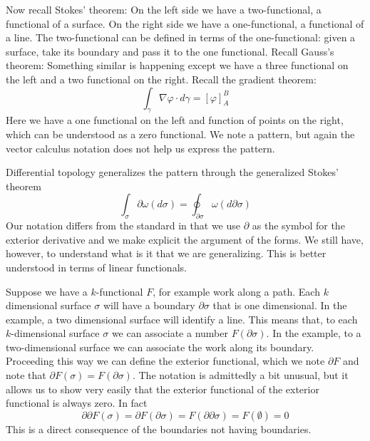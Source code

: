 \documentclass[fleqn,10pt]{wlscirep}
\begin{document}

Now recall Stokes' theorem:
On the left side we have a two-functional, a functional of a surface. On the right side we have a one-functional, a functional of a line. The two-functional can be defined in terms of the one-functional: given a surface, take its boundary and pass it to the one functional. Recall Gauss's theorem:
Something similar is happening except we have a three functional on the left and a two functional on the right. Recall the gradient theorem:
\begin{equation*}
	\int_\gamma \nabla \varphi \cdot d\gamma = \left[ \varphi \right]_A^B
\end{equation*}
Here we have a one functional on the left and function of points on the right, which can be understood as a zero functional. We note a pattern, but again the vector calculus notation does not help us express the pattern.

Differential topology generalizes the pattern through the generalized Stokes' theorem
\begin{equation*}
	\int_\sigma \partial \omega(d\sigma) = \oint_{\partial \sigma} \omega(d\partial\sigma)
\end{equation*}
Our notation differs from the standard in that we use $\partial$ as the symbol for the exterior derivative and we make explicit the argument of the forms. We still have, however, to understand what is it that we are generalizing. This is better understood in terms of linear functionals.

Suppose we have a $k$-functional $F$, for example work along a path. Each $k$ dimensional surface $\sigma$ will have a boundary $\partial \sigma$ that is one dimensional. In the example, a two dimensional surface will identify a line. This means that, to each $k$-dimensional surface $\sigma$ we can associate a number $F(\partial \sigma)$. In the example, to a two-dimensional surface we can associate the work along its boundary. Proceeding this way we can define the exterior functional, which we note $\partial F$ and note that $\partial F(\sigma) = F(\partial \sigma)$. The notation is admittedly a bit unusual, but it allows us to show very easily that the exterior functional of the exterior functional is always zero. In fact
\begin{equation*}
	\partial \partial F(\sigma) = \partial F(\partial \sigma) = F(\partial \partial \sigma) = F(\emptyset) = 0
\end{equation*}
This is a direct consequence of the boundaries not having boundaries.
\end{document}
